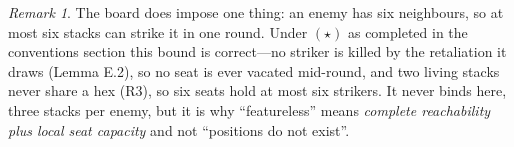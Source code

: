 \documentclass[11pt,a4paper]{article}
\theoremstyle{plain}
\theoremstyle{definition}
\theoremstyle{plain}
\theoremstyle{definition}
\theoremstyle{remark}
\newtheorem*{remark}{Remark}
\begin{document}
\begin{remark}
The board does impose one thing: an enemy has six neighbours, so at most six stacks can strike
it in one round. Under $(\star)$ as completed in the conventions section this bound is
correct---no striker is killed by the retaliation it draws (Lemma E.2), so no seat is ever
vacated mid-round, and two living stacks never share a hex (R3), so six seats hold at most six
strikers. It never binds here, three stacks per enemy, but it is why ``featureless''
means \emph{complete reachability plus local seat capacity} and not ``positions do not
exist''.
\end{remark}
\end{document}
